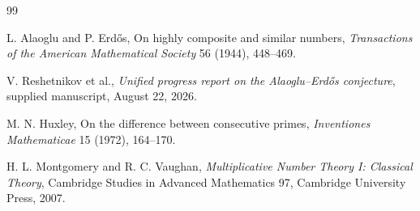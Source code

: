 \documentclass[11pt,oneside]{article}
\theoremstyle{definition}
\theoremstyle{remark}
\begin{document}
\begin{thebibliography}{99}

L. Alaoglu and P. Erd\H{o}s,
\newblock On highly composite and similar numbers,
\newblock \emph{Transactions of the American Mathematical Society} 56 (1944), 448--469.

V. Reshetnikov et al.,
\newblock \emph{Unified progress report on the Alaoglu--Erd\H{o}s conjecture},
\newblock supplied manuscript, August 22, 2026.

M. N. Huxley,
\newblock On the difference between consecutive primes,
\newblock \emph{Inventiones Mathematicae} 15 (1972), 164--170.

H. L. Montgomery and R. C. Vaughan,
\newblock \emph{Multiplicative Number Theory I: Classical Theory},
\newblock Cambridge Studies in Advanced Mathematics 97, Cambridge University Press, 2007.

\end{thebibliography}
\end{document}
